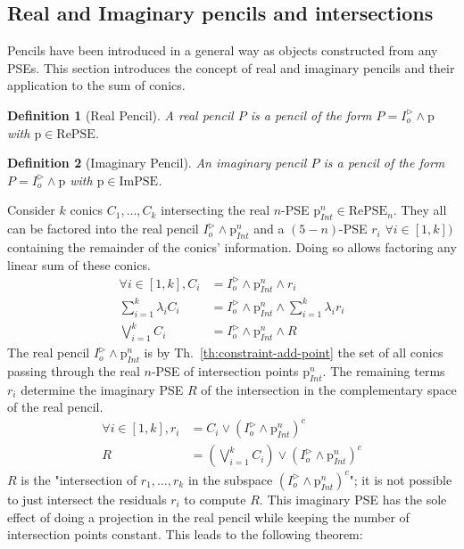 \documentclass{birkjour}
\newtheorem{definition}{Definition}
\begin{document}
\subsection{Real and Imaginary pencils and intersections}

Pencils have been introduced in a general way as objects constructed from any PSEs. This section introduces the concept of real and imaginary pencils and their application to the sum of conics.
\begin{definition}[Real Pencil]
    A real pencil \(P\) is a pencil of the form \(P = I_o^\triangleright\wedge\mathrm{p}\) with \(\mathrm{p}\in \mathrm{RePSE}\).
\end{definition}
\begin{definition}[Imaginary Pencil]
    An imaginary pencil \(P\) is a pencil of the form \(P = I_o^\triangleright\wedge\mathrm{p}\) with \(\mathrm{p}\in \mathrm{ImPSE}\).
\end{definition}
Consider \(k\) conics \(C_1,\dots,C_k\) intersecting the real \(n\)-PSE
\(\mathrm{p}^n_{Int}\in \mathrm{RePSE}_n\). They all can be factored into the real pencil \(I_o^\triangleright\wedge \mathrm{p}^n_{Int}\) and a \((5-n)\)-PSE \(r_i\) \(\forall i\in[1,k])\) containing the remainder of the conics' information. Doing so allows factoring any linear sum of these conics.
\begin{align}\label{eq:k-conics-to-intersect}
    \forall i \in [1,k], C_i &= I_o^\triangleright \wedge \mathrm{p}^n_{Int} \wedge r_i \\
    \sum_{i=1}^k \lambda_i C_i &= I^\triangleright_o \wedge \mathrm{p}^n_{Int} \wedge \sum_{i=1}^k \lambda_i r_i  \\
    \bigvee_{i=1}^k  C_i &= I^\triangleright_o \wedge \mathrm{p}^n_{Int} \wedge R  
\end{align}
The real pencil \(I_o^\triangleright \wedge \mathrm{p}_{Int}^n\) is by Th.~\ref{th:constraint-add-point} the set of all conics passing through the real \(n\)-PSE of intersection points \(\mathrm{p}_{Int}^n\). The remaining terms \(r_i\) determine the imaginary PSE \(R\) of the intersection in the complementary space of the real pencil. 
\begin{align}
    \forall i \in [1,k], r_i &= C_i \vee \left(I_o^\triangleright \wedge \mathrm{p}_{Int}^n\right)^c \\
    R &= \left(\bigvee_{i=1}^k C_i\right) \vee \left(I_o^\triangleright\wedge \mathrm{p}_{Int}^n\right)^c
\end{align}
\(R\) is the "intersection of \(r_1,\dots,r_k\) in the subspace \(\left(I_o^\triangleright \wedge \mathrm{p}^n_{Int}\right)^c\)"; it is not possible to just intersect the residuals \(r_i\) to compute \(R\). This imaginary PSE has the sole effect of doing a projection in the real pencil while keeping the number of intersection points constant. This leads to the following theorem:
\end{document}
